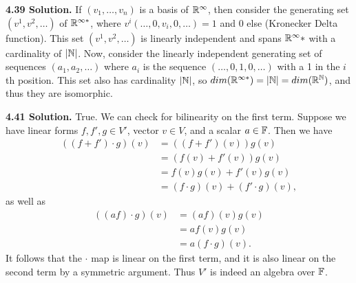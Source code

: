 \textbf{4.39 Solution.} If $(v_1, \dots, v_n)$ is a basis of $\mathbb{R}^{\infty}$, then consider the generating set $(v^1, v^2, \dots)$ of $\mathbb{R}^{\infty*}$, where $v^i(\dots, 0, v_i, 0, \dots) = 1$ and 0 else (Kronecker Delta function). This set $(v^1, v^2, \dots)$ is linearly independent and spans $\mathbb{R}^{\infty}*$ with a cardinality of $|\mathbb{N}|$. Now, consider the linearly independent generating set of sequences $(a_1, a_2, \dots)$ where $a_i$ is the sequence $(\dots, 0, 1, 0, \dots)$ with a 1 in the $i$th position. This set also has cardinality $|\mathbb{N}|$, so $dim(\mathbb{R}^{\infty*}) = |\mathbb{N}| = dim(\mathbb{R}^{\mathbb{N}})$, and thus they are isomorphic.

\textbf{4.41 Solution.} True. We can check for bilinearity on the first term. Suppose we have linear forms $f, f', g \in V'$, vector $v \in V$, and a scalar $a \in \mathbb{F}$. Then we have
\begin{align*}
    ((f + f') \cdot g)(v) &= ((f + f')(v))g(v) \\
        &= (f(v) + f'(v))g(v) \\
        &= f(v)g(v) + f'(v)g(v) \\
        &= (f \cdot g)(v) + (f' \cdot g)(v),
\end{align*}
as well as
\begin{align*}
    ((af) \cdot g)(v) &= (af)(v)g(v) \\
        &= af(v)g(v) \\
        &= a(f \cdot g)(v).
\end{align*}
It follows that the $\cdot$ map is linear on the first term, and it is also linear on the second term by a symmetric argument. Thus $V'$ is indeed an algebra over $\mathbb{F}$.